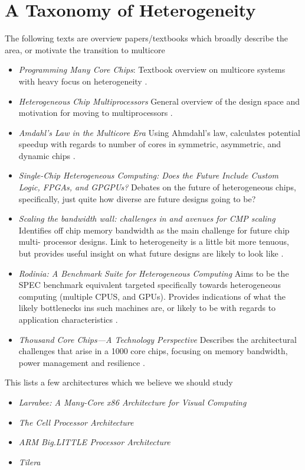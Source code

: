 \section{A Taxonomy of Heterogeneity}

The following texts are overview papers/textbooks which
broadly describe the area, or motivate the transition
to multicore
\begin{itemize}
\item \emph{Programming Many Core Chips}: Textbook overview
on multicore systems with heavy focus on heterogeneity \cite{Vajda:1414193}.

\item \emph{Heterogeneous Chip Multiprocessors} General overview
of the design space and motivation for moving to multiprocessors \cite{Kumar:2005:HCM:1100859.1100890}.
\item \emph{Amdahl's Law in the Multicore Era} Using Ahmdahl's law,
calculates potential speedup with regards to number of cores
in symmetric, asymmetric, and dynamic chips \cite{4563876}.
\item \emph{Single-Chip Heterogeneous Computing: Does the Future Include Custom 
Logic, FPGAs, and GPGPUs?} Debates on the future 
of heterogeneous chips, specifically, just quite how diverse
are future designs going to be? \cite{5695539}
\item \emph{Scaling the bandwidth wall: challenges in and avenues for CMP scaling}
Identifies off chip memory bandwidth as the main challenge for future chip multi-
processor designs. Link to heterogeneity is a little bit more tenuous, but
provides useful insight on what future designs are likely to look like \cite{Rogers_scalingthe}.
\item \emph{Rodinia: A Benchmark Suite for Heterogeneous Computing} Aims
to be the SPEC benchmark equivalent targeted specifically towards heterogeneous
computing (multiple CPUS, and GPUs). Provides indications of what the likely
bottlenecks ins such machines are, or likely to be with regards to application
characteristics \cite{5306797}.
\item \emph{Thousand Core Chips—A Technology Perspective} Describes the
architectural challenges that arise in a 1000 core chips, focusing
on memory bandwidth, power management and resilience \cite{Borkar:2007:TCC:1278480.1278667}.

\end{itemize}

This lists a few architectures which we believe we should study
\begin{itemize}
\item \emph{Larrabee: A Many-Core x86 Architecture for Visual Computing} \cite{4796165}
\item \emph{The Cell Processor Architecture} \cite{1540943}
\item \emph{ARM Big.LITTLE Processor Architecture} \cite{ABL}
\item \emph{Tilera} \cite{Wentzlaff:2007:OIA:1320302.1320834}
\end{itemize}

